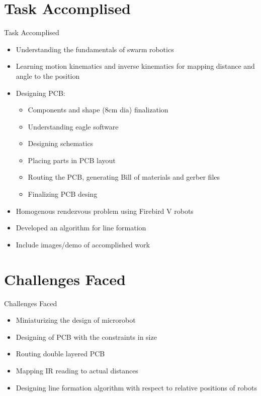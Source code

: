 \documentclass[10pt, a4paper]{beamer}
\begin{document}
\section{Task Accomplised}
\begin{frame}{Task Accomplised}
	\begin{itemize}
		\setlength\itemsep{-0.5em}
		\item Understanding the fundamentals of swarm robotics
		\item Learning motion kinematics and inverse kinematics for mapping distance and angle to the position
		\item Designing PCB:
		\begin{itemize}
			\setlength\itemsep{-1em}
			\item Components and shape (8cm dia) finalization
			\item Understanding eagle software
			\item Designing schematics
			\item Placing parts in PCB layout
			\item Routing the PCB, generating Bill of materials and gerber files
			\item Finalizing PCB desing
		\end{itemize}
		\item Homogenous rendezvous problem using Firebird V robots
		\item Developed an algorithm for line formation
		\item Include images/demo of accomplished work
	\end{itemize}
\end{frame}

\section{Challenges Faced}
\begin{frame}{Challenges Faced}
	\begin{itemize}
		\item Miniaturizing the design of microrobot
		\item Designing of PCB with the constraints in size
		\item Routing double layered PCB
		\item Mapping IR reading to actual distances
		\item Designing line formation algorithm with respect to relative positions of robots
	\end{itemize}
\end{frame}
\end{document}
